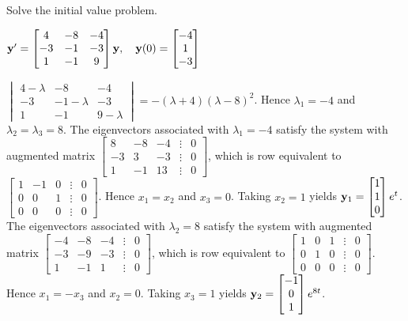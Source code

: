 \documentclass{ximera}
\begin{document}
 \begin{problem}\label{exer:10.5.22} 
 Solve the initial value problem.
 
 $ {\bf y}'
= \begin{bmatrix}4&-8&-4\\-3&-1&-3\\1&-1&9\end{bmatrix}{\bf y},\quad
{\bf y}(0)= \begin{bmatrix}-4\\1\\-3\end{bmatrix}$

\begin{solution}
    $ \begin{vmatrix}4-\lambda&-8&-4\\-3&-1-\lambda&-3\\1&-1&9-\lambda\end{vmatrix}
=-(\lambda+4)(\lambda-8)^2$.
Hence $\lambda_1=-4$ and  $\lambda_2=\lambda_3=8$.
The eigenvectors associated
 with $\lambda_1=-4$ satisfy the system with  augmented matrix
$  \begin{bmatrix}8&-8&-4&\vdots&0\\-3&3&-3&
\vdots&0\\1&-1&13&\vdots&0 \end{bmatrix}$,
which is row equivalent to
$  \begin{bmatrix}1&-1&0&\vdots&0\\0&0&1&
\vdots&0\\0&0&0&\vdots&0 \end{bmatrix}$.
Hence  $x_1=x_2$ and $x_3=0$.  Taking $x_2=1$
yields
${\bf y}_1=  \begin{bmatrix}1\\1\\0\end{bmatrix}e^{t}$.
The eigenvectors associated
 with $\lambda_2=8$ satisfy the system with  augmented matrix
$  \begin{bmatrix}-4&-8&-4&\vdots&0\\-3&-9&-3&
\vdots&0\\1&-1&1&\vdots&0 \end{bmatrix}$,
which is row equivalent to
$  \begin{bmatrix}1&0&1&\vdots&0\\0&1&0&
\vdots&0\\0&0&0&\vdots&0 \end{bmatrix}$.
Hence  $x_1=-x_3$ and $x_2=0$.  Taking $x_3=1$
yields
${\bf y}_2=  \begin{bmatrix}-1\\0\\1\end{bmatrix}e^{8t}$.

\end{solution}
\end{problem}
\end{document}
